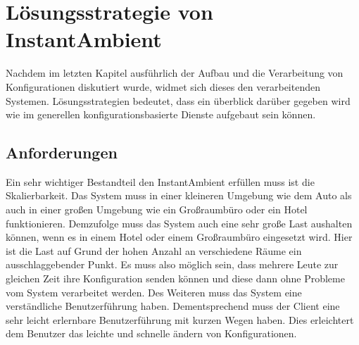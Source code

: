 \chapter{Lösungsstrategie von InstantAmbient}
Nachdem im letzten Kapitel ausführlich der Aufbau und die Verarbeitung von Konfigurationen diskutiert wurde, widmet sich dieses den verarbeitenden Systemen.
Lösungsstrategien bedeutet, dass ein überblick darüber gegeben wird wie im generellen konfigurationsbasierte Dienste aufgebaut sein können.

\section{Anforderungen}
Ein sehr wichtiger Bestandteil den InstantAmbient erfüllen muss ist die Skalierbarkeit. 
Das System muss in einer kleineren Umgebung wie dem Auto als auch in einer großen Umgebung wie ein Großraumbüro oder ein Hotel funktionieren. 
Demzufolge muss das System auch eine sehr große Last aushalten können, wenn es in einem Hotel oder einem Großraumbüro eingesetzt wird. 
Hier ist die Last auf Grund der hohen Anzahl an verschiedene Räume ein ausschlaggebender Punkt. Es muss also möglich sein, 
dass mehrere Leute zur gleichen Zeit ihre Konfiguration senden können und diese dann ohne Probleme vom System verarbeitet werden. 
Des Weiteren muss das System eine verständliche Benutzerführung haben. Dementsprechend muss der Client eine sehr leicht erlernbare Benutzerführung mit kurzen Wegen haben. 
Dies erleichtert dem Benutzer das leichte und schnelle ändern von Konfigurationen.   


